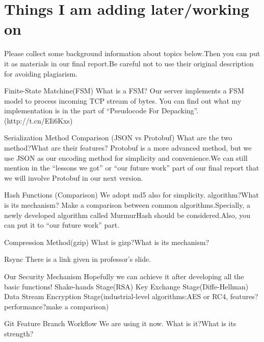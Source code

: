 \documentclass{article}
\begin{document}
\section{Things I am adding later/working on}

Please collect some background information about topics below.Then you can put it as materials in our final report.Be careful not to use their original description for avoiding plagiarism.

Finite-State Matchine(FSM)
What is a FSM?
Our server implements a FSM model to process incoming TCP stream of bytes.
You can find out what my implementation is in the part of “Pseudocode For Depacking”. (http://t.cn/EIi6Kxs)

Serialization Method Comparison (JSON vs Protobuf)
What are the two method?What are their features?
Protobuf is a more advanced method, but we use JSON as our encoding method for simplicity and convenience.We can still mention in the “lessons we got” or “our future work” part of our final report that we will involve Protobuf in our next version.

Hash Functions (Comparison)
We adopt md5 also for simplicity. algorithm?What is its mechanism?
Make a comparison between common algorithms.Specially, a newly developed algorithm called MurmurHash should be considered.Also, you can put it to “our future work” part.

Compression Method(gzip)
What is gizp?What is its mechanism?

Rsync
There is a link given in professor’s slide.

Our Security Mechanism
Hopefully we can achieve it after developing all the basic functions!
Shake-hands Stage(RSA)
Key Exchange Stage(Diffe-Hellman)
Data Stream Encryption Stage(industrial-level algorithms:AES or RC4, features?performance?make a comparison)

Git Feature Branch Workflow
We are using it now. What is it?What is its strength?
\end{document}
